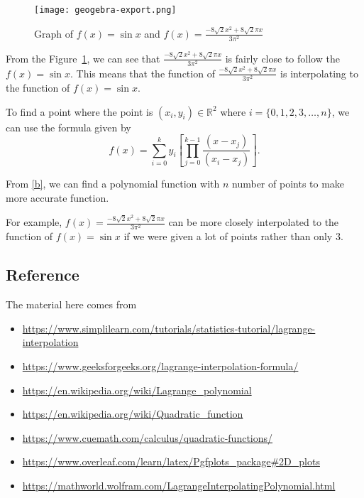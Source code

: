\documentclass[11pt, a4paper]{amsart}
\theoremstyle{plain}
\theoremstyle{definition}
\theoremstyle{remark}
\begin{document}
\begin{figure}
	\texttt{[image: geogebra-export.png]}
	\caption{Graph of $f(x)=\sin x$ and $f(x)=\frac{-8\sqrt{2}x^2+8\sqrt{2}\pi x}{3\pi ^2}$}
	\label{fig:geogebra}
\end{figure}

From the Figure~\ref{fig:geogebra}, we can see that $\frac{-8\sqrt{2}x^2+8\sqrt{2}\pi x}{3\pi ^2}$ is fairly close to follow the $f(x)=\sin x$. This means that the function of $\frac{-8\sqrt{2}x^2+8\sqrt{2}\pi x}{3\pi ^2}$ is interpolating to the function of $f(x) = \sin x$.

To find a point where the point is $(x_i,y_i) \in \mathbb{R}^2$ where $i=\{0,1,2,3,\ldots,n\}$, we can use the formula given by
\begin{equation}
\label{b}
	f(x) = \sum_{i=0}^{k} y_i[\prod_{j=0}^{k-1}\frac{(x-x_j)}{(x_i-x_j)}].
\end{equation}

From \ref{b}, we can find a polynomial function with $n$ number of points to make more accurate function. 

For example, $f(x) = \frac{-8\sqrt{2}x^2+8\sqrt{2}\pi x}{3\pi ^2}$ can be more closely interpolated to the function of $f(x) = \sin x$ if we were given a lot of points rather than only 3.

\subsection{Reference}
The material here comes from 
\begin{itemize}

\item \url{https://www.simplilearn.com/tutorials/statistics-tutorial/lagrange-interpolation}
\item \url{https://www.geeksforgeeks.org/lagrange-interpolation-formula/}
\item \url{https://en.wikipedia.org/wiki/Lagrange_polynomial}
\item \url{https://en.wikipedia.org/wiki/Quadratic_function}
\item \url{https://www.cuemath.com/calculus/quadratic-functions/}
\item \url{https://www.overleaf.com/learn/latex/Pgfplots_package#2D_plots}
\item \url{https://mathworld.wolfram.com/LagrangeInterpolatingPolynomial.html}

\end{itemize}
\end{document}

